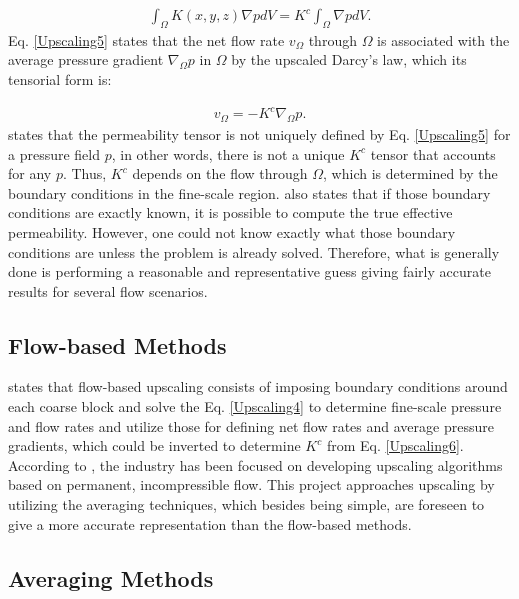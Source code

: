 \begin{align}
\label{Upscaling5}
\int_{\Omega}K(x,y,z)\nabla p dV=K^c \int_{\Omega}\nabla p dV.
\end{align}
\noindent
Eq. \ref{Upscaling5} states that the net flow rate $v_\Omega$ through $\Omega$ is associated with the average pressure gradient $\nabla_\Omega p$ in $\Omega$ by the upscaled Darcy's law, which its tensorial form is:

\begin{align}
\label{Upscaling6}
v_\Omega=-K^c\nabla_\Omega p.
\end{align}
\noindent
\cite{Lie2015} states that the permeability tensor is not uniquely defined by Eq. \ref{Upscaling5} for a pressure field $p$, in other words, there is not a unique $K^c$ tensor that accounts for any $p$. Thus, $K^c$ depends on the flow through $\Omega$, which is determined by the boundary conditions in the fine-scale region. \cite{Lie2015} also states that if those boundary conditions are exactly known, it is possible to compute the true effective permeability. However, one could not know exactly what those boundary conditions are unless the problem is already solved. Therefore, what is generally done is performing a reasonable and representative guess giving fairly accurate results for several flow scenarios.

\subsection{Flow-based Methods}

\cite{Lie2015} states that flow-based upscaling consists of imposing boundary conditions around each coarse block and solve the Eq. \ref{Upscaling4} to determine fine-scale pressure and flow rates and utilize those for defining net flow rates and average pressure gradients, which could be inverted to determine $K^c$ from Eq. \ref{Upscaling6}. According to \cite{Nunna2015}, the industry has been focused on developing upscaling algorithms based on permanent, incompressible flow. This project approaches upscaling by utilizing the averaging techniques, which besides being simple, are foreseen to give a more accurate representation than the flow-based methods.

\subsection{Averaging Methods}

